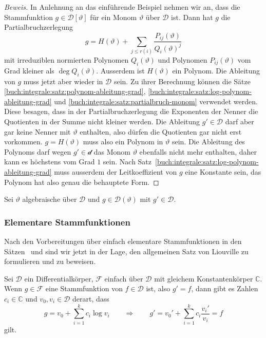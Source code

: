 \begin{proof}[Beweis]
In Anlehnung an das einführende Beispiel nehmen wir an, dass die
Stammfunktion $g\in\mathscr{D}[\vartheta]$ für ein Monom $\vartheta$
über $\mathscr{D}$ ist.
Dann hat $g$ die Partialbruchzerlegung
\[
g
=
H(\vartheta)
+
\sum_{j\le r(i)} \frac{P_{ij}(\vartheta)}{Q_i(\vartheta)^j}
\]
mit irreduziblen normierten Polynomen $Q_i(\vartheta)$ und
Polynomen $P_{ij}(\vartheta)$ vom Grad kleiner als $\deg Q_i(\vartheta)$.
Ausserdem ist $H(\vartheta)$ ein Polynom.
Die Ableitung von $g$ muss jetzt aber wieder in $\mathscr{D}$ sein.
Zu ihrer Berechnung können die Sätze
\ref{buch:integrale:satz:polynom-ableitung-grad},
\ref{buch:integrale:satz:log-polynom-ableitung-grad}
und
\ref{buch:integrale:satz:partialbruch-monom}
verwendet werden.
Diese besagen, dass in der Partialbruchzerlegung die Exponenten der
Nenner die Quotienten in der Summe nicht kleiner werden.
Die Ableitung $g'\in\mathscr{D}$ darf aber gar keine Nenner mit
$\vartheta$ enthalten, also dürfen die Quotienten gar nicht erst
vorkommen.
$g=H(\vartheta)$ muss also ein Polynom in $\vartheta$ sein.
Die Ableitung des Polynoms darf wegen $g'\in\mathscr{d}$ das Monom
$\vartheta$ ebenfalls nicht mehr enthalten, daher kann es höchstens vom
Grad $1$ sein.
Nach Satz~\ref{buch:integrale:satz:log-polynom-ableitung-grad}
muss ausserdem der Leitkoeffizient von $g$ eine Konstante sein,
das Polynom hat also genau die behauptete Form.
\end{proof}

\begin{satz}
\label{buch:integrale:satz:liouville-vorstufe-2}
Sei $\vartheta$ algebraische über $\mathscr{D}$ und
$g\in\mathscr{D}(\vartheta)$ mit $g'\in\mathscr{D}$.
\end{satz}

\subsubsection{Elementare Stammfunktionen}
Nach den Vorbereitungen über einfach elementare Stammfunktionen 
in den Sätzen~\label{buch:integrale:satz:liouville-vorstufe-1}
und
\label{buch:integrale:satz:liouville-vorstufe-2} sind wir jetzt
in der Lage, den allgemeinen Satz von Liouville zu formulieren
und zu beweisen.

\begin{satz}[Liouville]
Sei $\mathscr{D}$ ein Differentialkörper, $\mathscr{F}$ einfach über
$\mathscr{D}$ mit gleichem Konstantenkörper $\mathbb{C}$.
Wenn $g\in \mathscr{F}$ eine Stammfunktion von $f\in\mathscr{D}$ ist,
also $g'=f$, dann gibt es Zahlen $c_i\in\mathbb{C}$ und
$v_0,v_i\in\mathscr{D}$ derart, dass
\begin{equation}
g = v_0 + \sum_{i=1}^k c_i \log v_i
\qquad\Rightarrow\qquad
g' = v_0' + \sum_{i=1}^k c_i \frac{v_i'}{v_i} = f
\label{buch:integrale:satz:liouville-fform}
\end{equation}
gilt.
\end{satz}

